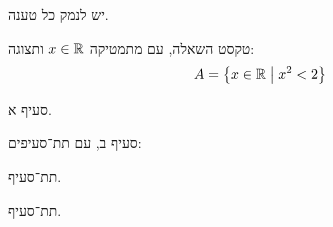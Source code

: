 \documentclass{infi-ex}
\begin{document}
\makeextitle

\begin{instructions}
יש לנמק כל טענה.
\end{instructions}


\begin{question}
טקסט השאלה, עם מתמטיקה $x\in\mathbb{R}$ ותצוגה:
\[ A=\left\{ x\in\mathbb{R} \;\middle|\; x^2<2 \right\} \]
\end{question}

\begin{question}   %
\begin{parts}
  \item סעיף א.
  \item סעיף ב, עם תת־סעיפים:
    \begin{parts}
      \item תת־סעיף.
      \item תת־סעיף.
    \end{parts}
\end{parts}
\end{question}

\goodluck   %

% 
\end{document}
